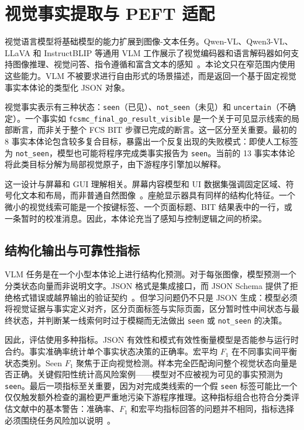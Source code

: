 \section{视觉事实提取与 PEFT 适配}\label{sec:bg-vlm}

视觉语言模型将基础模型的能力扩展到图像-文本任务。Qwen-VL、Qwen3-VL、LLaVA 和 InstructBLIP 等通用 VLM 工作展示了视觉编码器和语言解码器如何支持图像推理、视觉问答、指令遵循和富含文本的感知~\citep{bai2023qwen,qwen3vl2025,liu2023llava,dai2023instructblip}。本论文只在窄范围内使用这些能力。VLM 不被要求进行自由形式的场景描述，而是返回一个基于固定视觉事实本体论的类型化 JSON 对象。

视觉事实表示有三种状态：\texttt{seen}（已见）、\texttt{not\_seen}（未见）和 \texttt{uncertain}（不确定）。一个事实如 \texttt{fcsmc\_final\_go\_result\_visible} 是一个关于可见显示线索的局部断言，而非关于整个 FCS BIT 步骤已完成的断言。这一区分至关重要。最初的 8 事实本体论包含较多复合目标，暴露出一个反复出现的失败模式：即使人工标签为 \texttt{not\_seen}，模型也可能将程序完成类事实报告为 \texttt{seen}。当前的 13 事实本体论将此类目标分解为局部视觉原子，由下游程序引擎加以解释。

这一设计与屏幕和 GUI 理解相关。屏幕内容模型和 UI 数据集强调固定区域、符号化文本和布局，而非普通自然图像~\citep{deka2017rico,wang2021screen2words}。座舱显示器具有同样的结构化特征。一个微小的视觉线索可能是一个按键标签、一个页面标题、BIT 结果表中的一行，或一条暂时的校准消息。因此，本体论充当了感知与控制逻辑之间的桥梁。

\subsection{结构化输出与可靠性指标}\label{sec:bg-metrics}

VLM 任务是在一个小型本体论上进行结构化预测。对于每张图像，模型预测一个分类状态向量而非说明文字。JSON 格式是集成接口，而 JSON Schema 提供了拒绝格式错误或越界输出的验证契约~\citep{pezoa2016jsonschema}。但学习问题仍不只是 JSON 生成：模型必须将视觉证据与事实定义对齐，区分页面标签与实际页面，区分暂时性中间状态与最终状态，并判断某一线索何时过于模糊而无法做出 \texttt{seen} 或 \texttt{not\_seen} 的决策。

因此，评估使用多种指标。JSON 有效性和模式有效性衡量模型是否能参与运行时合约。事实准确率统计单个事实状态决策的正确率。宏平均 \(F_1\) 在不同事实间平衡状态类别。Seen \(F_1\) 聚焦于正向视觉检测。样本完全匹配询问整个视觉状态向量是否正确。关键假阳性统计高风险案例——模型对不应被视为可见的事实预测为 \texttt{seen}。最后一项指标至关重要，因为对完成类线索的一个假 \texttt{seen} 标签可能比一个仅仅触发额外检查的漏检更严重地污染下游程序推理。这种指标组合也符合分类评估文献中的基本警告：准确率、\(F_1\) 和宏平均指标回答的问题并不相同，指标选择必须围绕任务风险加以说明~\citep{powers2011evaluation,opitz2024metrics}。

